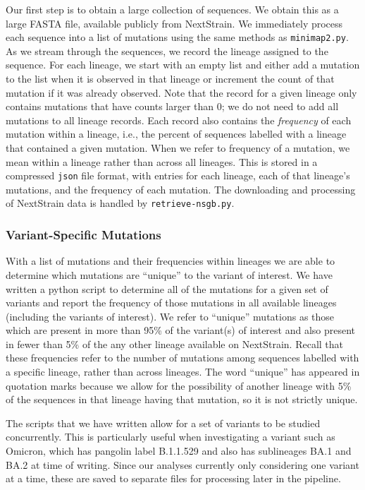 \documentclass{article}
\begin{document}
Our first step is to obtain a large collection of sequences.
We obtain this as a large FASTA file, available publicly from NextStrain.
We immediately process each sequence into a list of mutations using the same methods as \texttt{minimap2.py}.
As we stream through the sequences, we record the lineage assigned to the sequence.
For each lineage, we start with an empty list and either add a mutation to the list when it is observed in that lineage or increment the count of that mutation if it was already observed.
Note that the record for a given lineage only contains mutations that have counts larger than 0; we do not need to add all mutations to all lineage records.
Each record also contains the \emph{frequency} of each mutation within a lineage, i.e., the percent of sequences labelled with a lineage that contained a given mutation.
When we refer to frequency of a mutation, we mean within a lineage rather than across all lineages.
This is stored in a compressed \texttt{json} file format, with entries for each lineage, each of that lineage's mutations, and the frequency of each mutation.
The downloading and processing of NextStrain data is handled by \texttt{retrieve-nsgb.py}.



\subsubsection{Variant-Specific Mutations}

With a list of mutations and their frequencies within lineages we are able to determine which mutations are ``unique'' to the variant of interest.
We have written a python script to determine all of the mutations for a given set of variants and report the frequency of those mutations in all available lineages (including the variants of interest).
We refer to ``unique'' mutations as those which are present in more than 95\% of the variant(s) of interest and also present in fewer than 5\% of the any other lineage available on NextStrain.
Recall that these frequencies refer to the number of mutations among sequences labelled with a specific lineage, rather than across lineages.
The word ``unique'' has appeared in quotation marks because we allow for the possibility of another lineage with 5\% of the sequences in that lineage having that mutation, so it is not strictly unique. 

The scripts that we have written allow for a set of variants to be studied concurrently.
This is particularly useful when investigating a variant such as Omicron, which has pangolin label B.1.1.529 and also has sublineages BA.1 and BA.2 at time of writing.
Since our analyses currently only considering one variant at a time, these are saved to separate files for processing later in the pipeline.
\end{document}
